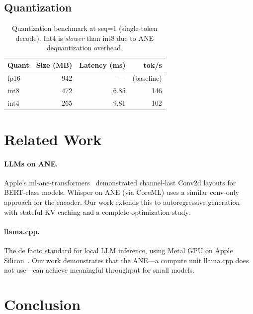 \documentclass[11pt,twocolumn]{article}
\begin{document}
\subsection{Quantization}

\begin{table}[t]
\centering
\footnotesize
\begin{tabular}{lrrr}
\toprule
\textbf{Quant} & \textbf{Size (MB)} & \textbf{Latency (ms)} & \textbf{tok/s} \\
\midrule
fp16 & 942 & --- & (baseline) \\
int8 & 472 & 6.85 & 146 \\
int4 & 265 & 9.81 & 102 \\
\bottomrule
\end{tabular}
\caption{Quantization benchmark at seq=1 (single-token decode). Int4
is \emph{slower} than int8 due to ANE dequantization overhead.}
\label{tab:quant}
\end{table}


\section{Related Work}
\label{sec:related}

\paragraph{LLMs on ANE.} Apple's ml-ane-transformers~\cite{apple2022}
demonstrated channel-last Conv2d layouts for BERT-class models.
Whisper on ANE (via CoreML) uses a similar conv-only approach for the
encoder. Our work extends this to autoregressive generation with
stateful KV caching and a complete optimization study.

\paragraph{llama.cpp.} The de facto standard for local LLM inference,
using Metal GPU on Apple Silicon~\cite{gerganov2023}. Our work
demonstrates that the ANE---a compute unit llama.cpp does not use---can
achieve meaningful throughput for small models.


\section{Conclusion}
\end{document}
